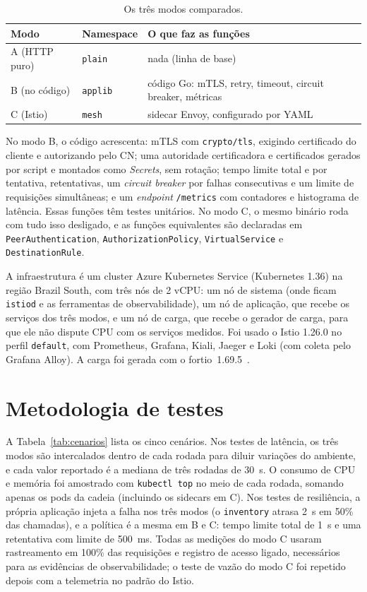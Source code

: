 \documentclass[12pt]{article}
\begin{document}
\begin{table}[ht]
\centering
\caption{Os três modos comparados.}
\label{tab:modos}
\small
\begin{tabular}{llp{7cm}}
\toprule
Modo & Namespace & O que faz as funções \\
\midrule
A (HTTP puro) & \texttt{plain} & nada (linha de base) \\
B (no código) & \texttt{applib} & código Go: mTLS, retry, timeout, circuit breaker, métricas \\
C (Istio) & \texttt{mesh} & sidecar Envoy, configurado por YAML \\
\bottomrule
\end{tabular}
\end{table}

No modo B, o código acrescenta: mTLS com \texttt{crypto/tls}, exigindo
certificado do cliente e autorizando pelo CN; uma autoridade certificadora e
certificados gerados por script e montados como \emph{Secrets}, sem rotação;
tempo limite total e por tentativa, retentativas, um \emph{circuit breaker} por
falhas consecutivas e um limite de requisições simultâneas; e um
\emph{endpoint} \texttt{/metrics} com contadores e histograma de latência. Essas
funções têm testes unitários. No modo C, o mesmo binário roda com tudo isso
desligado, e as funções equivalentes são declaradas em
\texttt{PeerAuthentication}, \texttt{AuthorizationPolicy}, \texttt{VirtualService}
e \texttt{DestinationRule}.

A infraestrutura é um cluster Azure Kubernetes Service (Kubernetes 1.36) na
região Brazil South, com três nós de 2 vCPU: um nó de sistema (onde ficam
\texttt{istiod} e as ferramentas de observabilidade), um nó de aplicação, que
recebe os serviços dos três modos, e um nó de carga, que recebe o gerador de
carga, para que ele não dispute CPU com os serviços medidos. Foi usado o Istio
1.26.0 no perfil \texttt{default}, com Prometheus, Grafana, Kiali, Jaeger e
Loki (com coleta pelo Grafana Alloy). A carga foi gerada com o
fortio~1.69.5~\cite{fortio}.

\section{Metodologia de testes}

A Tabela~\ref{tab:cenarios} lista os cinco cenários. Nos testes de latência,
os três modos são intercalados dentro de cada rodada para diluir variações do
ambiente, e cada valor reportado é a mediana de três rodadas de 30~s. O
consumo de CPU e memória foi amostrado com \texttt{kubectl top} no meio de cada
rodada, somando apenas os pods da cadeia (incluindo os sidecars em C). Nos
testes de resiliência, a própria aplicação injeta a falha nos três modos (o
\texttt{inventory} atrasa 2~s em 50\% das chamadas), e a política é a mesma em
B e C: tempo limite total de 1~s e uma retentativa com limite de 500~ms. Todas
as medições do modo C usaram rastreamento em 100\% das requisições e registro
de acesso ligado, necessários para as evidências de observabilidade; o teste
de vazão do modo C foi repetido depois com a telemetria no padrão do Istio.
\end{document}
